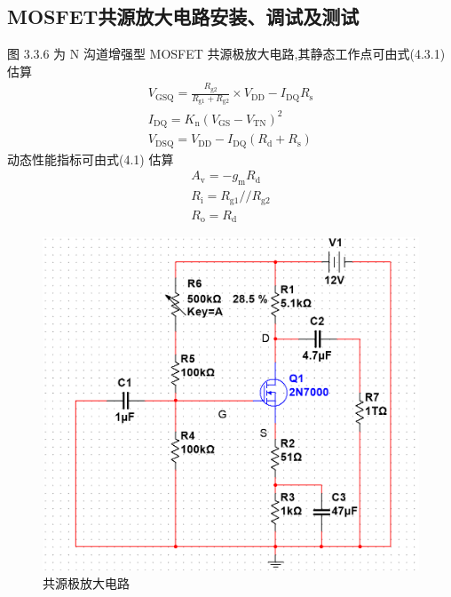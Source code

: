 \documentclass[a4paper,11pt,UTF8]{article}
\numberwithin{equation}{subsection}
\begin{document}
\subsection{MOSFET共源放大电路安装、调试及测试}
\begin{minipage}[t]{0.6\textwidth}
	图 3.3.6 为 N 沟道增强型 MOSFET 共源极放大电路,其静态工作点可由式(4.3.1) 估算
	\begin{subequations}\begin{align}
			V_{\mathrm{GSQ}}=\frac{R_{\mathrm{g2}}}{R_{\mathrm{g1}}+R_{\mathrm{g2}}}\times V_{\mathrm{DD}}-I_{\mathrm{DQ}}R_{\mathrm{s}}  \\
			I_{\mathrm{DQ}}=K_{\mathrm{n}}\left(V_{\mathrm{GS}}-V_{\mathrm{TN}}\right)^{2} \\
			V_{\mathrm{DSQ}}=V_{\mathrm{DD}}-I_{\mathrm{DQ}}(R_{\mathrm{d}}+R_{\mathrm{s}}) 
	\end{align}\end{subequations}
	动态性能指标可由式(4.1) 估算
	\begin{subequations}\begin{align}
			A_\mathrm{v}=-g_\mathrm{m}R_\mathrm{d}\\
			R_{\mathrm{i}}=R_{\mathrm{g1}}//R_{\mathrm{g2}}\\
			R_{\mathrm{o}}=R_{\mathrm{d}}
	\end{align}\end{subequations}
\end{minipage}
\begin{minipage}[t]{0.4\textwidth}
	\begin{figure}[H]
		\centering
		\includegraphics[width=\textwidth]{2.2}
		\caption{共源极放大电路}
	\end{figure}
\end{minipage}
\end{document}
